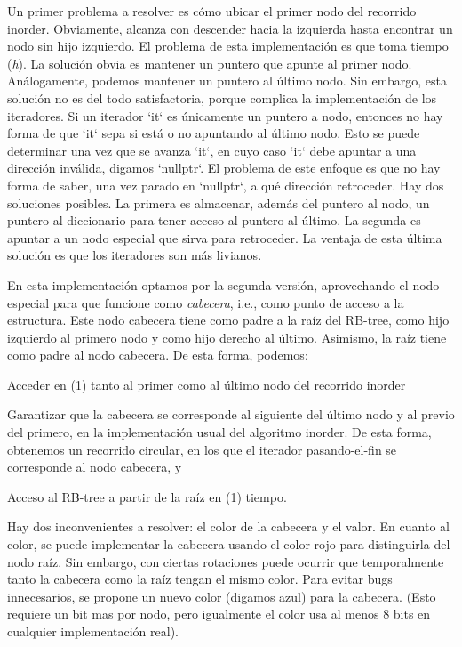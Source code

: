 \-Un primer problema a resolver es cómo ubicar el primer nodo del recorrido inorder. \-Obviamente, alcanza con descender hacia la izquierda hasta encontrar un nodo sin hijo izquierdo. \-El problema de esta implementación es que toma tiempo ({\itshape h\/}). \-La solución obvia es mantener un puntero que apunte al primer nodo. \-Análogamente, podemos mantener un puntero al último nodo. \-Sin embargo, esta solución no es del todo satisfactoria, porque complica la implementación de los iteradores. \-Si un iterador `it` es únicamente un puntero a nodo, entonces no hay forma de que `it` sepa si está o no apuntando al último nodo. \-Esto se puede determinar una vez que se avanza `it`, en cuyo caso `it` debe apuntar a una dirección inválida, digamos `nullptr`. \-El problema de este enfoque es que no hay forma de saber, una vez parado en `nullptr`, a qué dirección retroceder. \-Hay dos soluciones posibles. \-La primera es almacenar, además del puntero al nodo, un puntero al diccionario para tener acceso al puntero al último. \-La segunda es apuntar a un nodo especial que sirva para retroceder. \-La ventaja de esta última solución es que los iteradores son más livianos.

\-En esta implementación optamos por la segunda versión, aprovechando el nodo especial para que funcione como {\itshape cabecera\/}, i.\-e., como punto de acceso a la estructura. \-Este nodo cabecera tiene como padre a la raíz del \-R\-B-\/tree, como hijo izquierdo al primero nodo y como hijo derecho al último. \-Asimismo, la raíz tiene como padre al nodo cabecera. \-De esta forma, podemos\-:
\begin{DoxyEnumerate}
\item \-Acceder en (1) tanto al primer como al último nodo del recorrido inorder
\item \-Garantizar que la cabecera se corresponde al siguiente del último nodo y al previo del primero, en la implementación usual del algoritmo inorder. \-De esta forma, obtenemos un recorrido circular, en los que el iterador pasando-\/el-\/fin se corresponde al nodo cabecera, y
\item \-Acceso al \-R\-B-\/tree a partir de la raíz en (1) tiempo.
\end{DoxyEnumerate}

\-Hay dos inconvenientes a resolver\-: el color de la cabecera y el valor. \-En cuanto al color, se puede implementar la cabecera usando el color rojo para distinguirla del nodo raíz. \-Sin embargo, con ciertas rotaciones puede ocurrir que temporalmente tanto la cabecera como la raíz tengan el mismo color. \-Para evitar bugs innecesarios, se propone un nuevo color (digamos azul) para la cabecera. (\-Esto requiere un bit mas por nodo, pero igualmente el color usa al menos 8 bits en cualquier implementación real).

